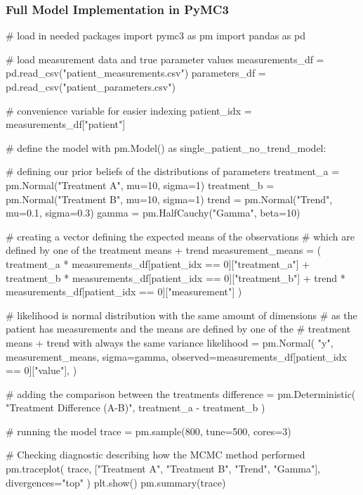 \documentclass[12pt,a4paper,leqno]{report}
\theoremstyle{plain}
\theoremstyle{definition}
\theoremstyle{remark}
\begin{document}
\pagebreak

\subsubsection*{Full Model Implementation in PyMC3}

\begin{pyverbatim}[][fontsize=\footnotesize]
# load in needed packages
import pymc3 as pm
import pandas as pd

# load measurement data and true parameter values
measurements_df = pd.read_csv("patient_measurements.csv")
parameters_df = pd.read_csv("patient_parameters.csv")

# convenience variable for easier indexing
patient_idx = measurements_df["patient"]
   
# define the model
with pm.Model() as single_patient_no_trend_model:

    # defining our prior beliefs of the distributions of parameters
    treatment_a = pm.Normal("Treatment A", mu=10, sigma=1)
    treatment_b = pm.Normal("Treatment B", mu=10, sigma=1)
    trend = pm.Normal("Trend", mu=0.1, sigma=0.3)
    gamma = pm.HalfCauchy("Gamma", beta=10)

    # creating a vector defining the expected means of the observations
    # which are defined by one of the treatment means + trend
    measurement_means = (
        treatment_a * measurements_df[patient_idx == 0]["treatment_a"]
        + treatment_b * measurements_df[patient_idx == 0]["treatment_b"]
        + trend * measurements_df[patient_idx == 0]["measurement"]
    )

    # likelihood is normal distribution with the same amount of dimensions
    # as the patient has measurements and the means are defined by one of the
    # treatment means + trend with always the same variance
    likelihood = pm.Normal(
        "y",
        measurement_means,
        sigma=gamma,
        observed=measurements_df[patient_idx == 0]["value"],
    )

    # adding the comparison between the treatments
    difference = pm.Deterministic(
        "Treatment Difference (A-B)", treatment_a - treatment_b
    )

    # running the model
    trace = pm.sample(800, tune=500, cores=3)

    # Checking diagnostic describing how the MCMC method performed
    pm.traceplot(
        trace, ["Treatment A", "Treatment B", "Trend", "Gamma"], divergences="top"
    )
    plt.show()
    pm.summary(trace)


\end{pyverbatim}
\end{document}
